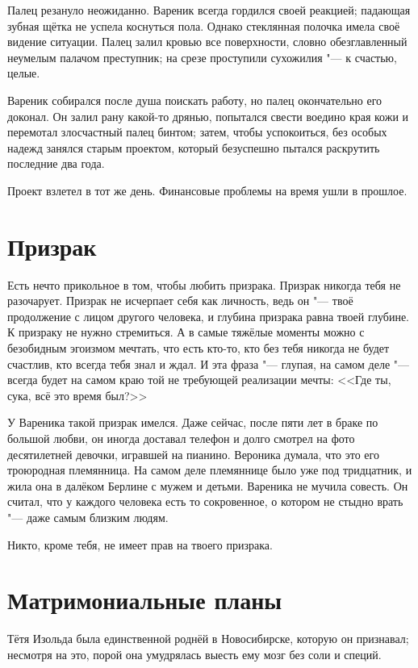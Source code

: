 Палец резануло неожиданно.
Вареник всегда гордился своей реакцией;
падающая зубная щётка не успела коснуться пола.
Однако стеклянная полочка имела своё видение ситуации.
Палец залил кровью все поверхности, словно обезглавленный неумелым палачом преступник;
на срезе проступили сухожилия "--- к счастью, целые.

Вареник собирался после душа поискать работу, но палец окончательно его доконал. 
Он залил рану какой-то дрянью, попытался свести воедино края кожи и перемотал злосчастный палец бинтом;
затем, чтобы успокоиться, без особых надежд занялся старым проектом, который безуспешно пытался раскрутить последние два года.

Проект взлетел в тот же день.
Финансовые проблемы на время ушли в прошлое.

\section{Призрак}

Есть нечто прикольное в том, чтобы любить призрака.
Призрак никогда тебя не разочарует.
Призрак не исчерпает себя как личность, ведь он "--- твоё продолжение с лицом другого человека, и глубина призрака равна твоей глубине.
К призраку не нужно стремиться.
А в самые тяжёлые моменты можно с безобидным эгоизмом мечтать, что есть кто-то, кто без тебя никогда не будет счастлив, кто всегда тебя знал и ждал.
И эта фраза "--- глупая, на самом деле "--- всегда будет на самом краю той не требующей реализации мечты: <<Где ты, сука, всё это время был?>>

У Вареника такой призрак имелся.
Даже сейчас, после пяти лет в браке по большой любви, он иногда доставал телефон и долго смотрел на фото десятилетней девочки, игравшей на пианино.
Вероника думала, что это его троюродная племянница.
На самом деле племяннице было уже под тридцатник, и жила она в далёком Берлине с мужем и детьми.
Вареника не мучила совесть.
Он считал, что у каждого человека есть то сокровенное, о котором не стыдно врать "--- даже самым близким людям.

Никто, кроме тебя, не имеет прав на твоего призрака.

\section{Матримониальные планы}

Тётя Изольда была единственной роднёй в Новосибирске, которую он признавал;
несмотря на это, порой она умудрялась выесть ему мозг без соли и специй.

